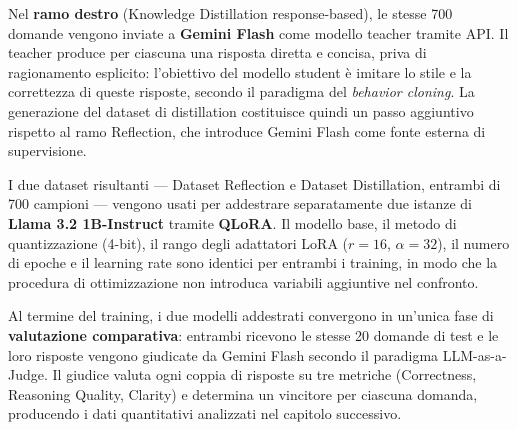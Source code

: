 Nel \textbf{ramo destro} (Knowledge Distillation response-based),
le stesse 700 domande vengono inviate a \textbf{Gemini Flash} come
modello teacher tramite API. Il teacher produce per ciascuna una
risposta diretta e concisa, priva di ragionamento esplicito: l'obiettivo
del modello student è imitare lo stile e la correttezza di queste
risposte, secondo il paradigma del \emph{behavior cloning}. La
generazione del dataset di distillation costituisce quindi un passo
aggiuntivo rispetto al ramo Reflection, che introduce Gemini Flash
come fonte esterna di supervisione.

I due dataset risultanti --- Dataset Reflection e Dataset Distillation,
entrambi di 700 campioni --- vengono usati per addestrare separatamente
due istanze di \textbf{Llama 3.2 1B-Instruct} tramite \textbf{QLoRA}.
Il modello base, il metodo di quantizzazione (4-bit), il rango degli
adattatori LoRA ($r = 16$, $\alpha = 32$), il numero di epoche e il
learning rate sono identici per entrambi i training, in modo che la
procedura di ottimizzazione non introduca variabili aggiuntive nel
confronto.

Al termine del training, i due modelli addestrati convergono in
un'unica fase di \textbf{valutazione comparativa}: entrambi ricevono
le stesse 20 domande di test e le loro risposte vengono giudicate
da Gemini Flash secondo il paradigma LLM-as-a-Judge. Il giudice
valuta ogni coppia di risposte su tre metriche (Correctness, Reasoning
Quality, Clarity) e determina un vincitore per ciascuna domanda,
producendo i dati quantitativi analizzati nel capitolo successivo.

